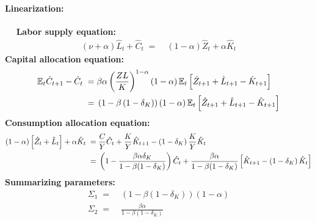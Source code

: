 \documentclass[a4paper, 12pt]{article}
\begin{document}
\begin{Answer}
\begin{small}
		\paragraph{Linearization:} $\quad$\linebreak%
		\textbf{Labor supply equation:}%
		\begin{align}%
			\left(\nu+\alpha\right) \hat{L}_t + \hat{C}_t \; = & \; \left(1-\alpha \right) \hat{Z}_t + \alpha \hat{K}_t\label{eq:labor_lin}%
		\end{align}%
		\textbf{Capital allocation equation:}%
		\begin{align}%
			\mathbb{E}_t \hat{C}_{t+1} - \hat{C}_t \; = & \; \beta \alpha \left(\frac{Z L}{K}\right)^{1-\alpha} \left(1-\alpha\right) \mathbb{E}_t \left[ \hat{Z}_{t+1} + \hat{L}_{t+1} - \hat{K}_{t+1} \right]\notag\\%
			= & \; \left(1-\beta \left(1-\delta_K\right)\right) \left(1-\alpha\right) \mathbb{E}_t \left[ \hat{Z}_{t+1} + \hat{L}_{t+1} - \hat{K}_{t+1} \right]\label{eq:capital_lin}%
		\end{align}%
		\textbf{Consumption allocation equation:}%
		\begin{align}%
			\left(1-\alpha\right)\left[ \hat{Z}_t + \hat{L}_t \right] + \alpha \hat{K}_t \; = & \; \frac{C}{Y} \hat{C}_t + \frac{K}{Y} \hat{K}_{t+1} - \left(1-\delta_K\right) \frac{K}{Y} \hat{K}_t\notag\\%
			= & \; \left(1-\frac{\beta \alpha \delta_K}{1-\beta(1-\delta_K)}\right) \hat{C}_t + \frac{\beta \alpha}{1-\beta(1-\delta_K)} \left[ \hat{K}_{t+1} - \left(1-\delta_K\right) \hat{K}_t \right]\label{eq:consumption_lin}%
		\end{align}%
		\textbf{Summarizing parameters:}%
		\begin{align*}%
			\Sigma_1 \; = & \; \left(1-\beta \left(1-\delta_K\right)\right) \left(1-\alpha\right)\\%
			\Sigma_2 \; = & \; \frac{\beta \alpha}{1-\beta(1-\delta_K)}%
		\end{align*}%
	\end{small}%
\end{Answer}%
\bigskip%
\end{document}

